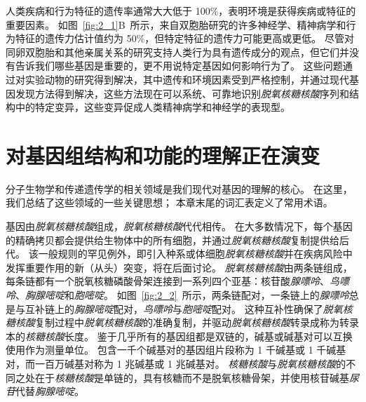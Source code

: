 人类疾病和行为特征的遗传率通常大大低于 100\%，表明环境是获得疾病或特征的重要因素。
如图~\ref{fig:2_1}B~所示，来自双胞胎研究的许多神经学、精神病学和行为特征的遗传力估计值约为 50\%，但特定特征的遗传力可能更高或更低。
尽管对同卵双胞胎和其他亲属关系的研究支持人类行为具有遗传成分的观点，但它们并没有告诉我们哪些基因是重要的，更不用说特定基因如何影响行为了。
这些问题通过对实验动物的研究得到解决，其中遗传和环境因素受到严格控制，并通过现代基因发现方法得到解决，这些方法现在可以系统、可靠地识别\textit{脱氧核糖核酸}序列和结构中的特定变异，这些变异促成人类精神病学和神经学的表现型。



\section{对基因组结构和功能的理解正在演变}

分子生物学和传递遗传学的相关领域是我们现代对基因的理解的核心。
在这里，我们总结了这些领域的一些关键思想；
本章末尾的词汇表定义了常用术语。


基因由\textit{脱氧核糖核酸}组成，\textit{脱氧核糖核酸}代代相传。
在大多数情况下，每个基因的精确拷贝都会提供给生物体中的所有细胞，并通过\textit{脱氧核糖核酸}复制提供给后代。
该一般规则的罕见例外，即引入种系或体细胞\textit{脱氧核糖核酸}并在疾病风险中发挥重要作用的新（从头）突变，将在后面讨论。
\textit{脱氧核糖核酸}由两条链组成，每条链都有一个脱氧核糖磷酸骨架连接到一系列四个亚基：核苷酸\textit{腺嘌呤}、\textit{鸟嘌呤}、\textit{胸腺嘧啶}和\textit{胞嘧啶}。
如图~\ref{fig:2_2}~所示，两条链配对，一条链上的\textit{腺嘌呤}总是与互补链上的\textit{胸腺嘧啶}配对，\textit{鸟嘌呤}与\textit{胞嘧啶}配对。
这种互补性确保了\textit{脱氧核糖核酸}复制过程中\textit{脱氧核糖核酸}的准确复制，并驱动\textit{脱氧核糖核酸}转录成称为转录本的\textit{核糖核酸}长度。
鉴于几乎所有的基因组都是双链的，碱基或碱基对可以互换使用作为测量单位。
包含一千个碱基对的基因组片段称为 1 千碱基或 1 千碱基对，而一百万碱基对称为 1 兆碱基或 1 兆碱基对。
\textit{核糖核酸}与\textit{脱氧核糖核酸}的不同之处在于\textit{核糖核酸}是单链的，具有核糖而不是脱氧核糖骨架，并使用核苷碱基\textit{尿苷}代替\textit{胸腺嘧啶}。


